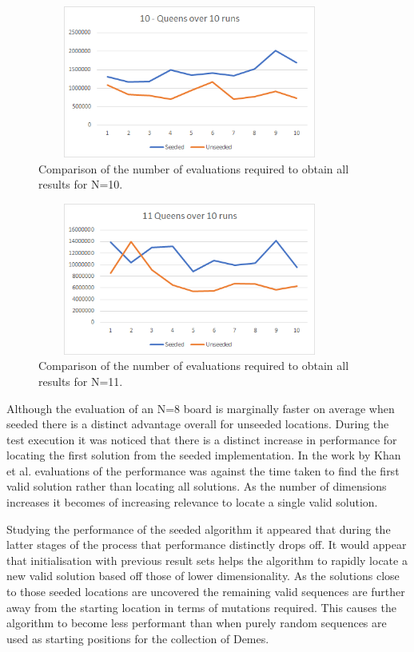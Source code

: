 \documentclass[a4paper,onecolumn,11pt]{article}
\begin{document}
\begin{figure}[!htbp]
	\centering	
	\includegraphics[width=10cm, height=5cm]{10QueensAllValues}
		\caption{Comparison of the number of evaluations required to obtain all results for N=10.}
\end{figure}

\begin{figure}[!htbp]
	\centering	
	\includegraphics[width=10cm, height=5cm]{11QueensAllValues}
		\caption{Comparison of the number of evaluations required to obtain all results for N=11.}
\end{figure}

Although the evaluation of an N=8 board is marginally faster on average when seeded there is a distinct advantage overall for unseeded locations. During the test execution it was noticed that there is a distinct increase in performance for locating the first solution from the seeded implementation. In the work by Khan et al. \cite{ACO} evaluations of the performance was against the time taken to find the first valid solution rather than locating all solutions. As the number of dimensions increases it becomes of increasing relevance to locate a single valid solution.

Studying the performance of the seeded algorithm it appeared that during the latter stages of the process that performance distinctly drops off.  It would appear that initialisation with previous result sets helps the algorithm to rapidly locate a new valid solution based off those of lower dimensionality. As the solutions close to those seeded locations are uncovered the remaining valid sequences are further away from the starting location in terms of mutations required. This causes the algorithm to become less performant than when purely random sequences are used as starting positions for the collection of Demes.
\end{document}
